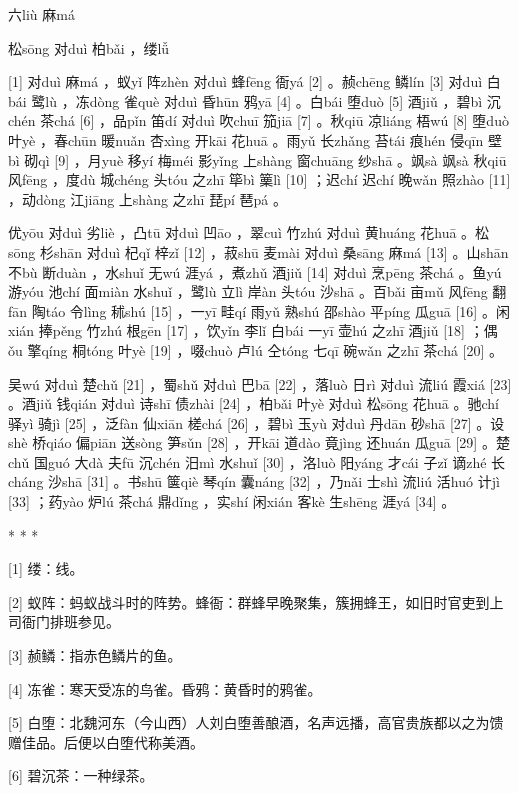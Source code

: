 \documentclass[12pt,UTF8]{ctexbook}
\begin{document}
六liù 麻má


松sōng 对duì 柏bǎi ，缕lǚ





[1] 对duì 麻má ，蚁yǐ 阵zhèn 对duì 蜂fēng 衙yá [2] 。赪chēng 鳞lín [3] 对duì 白bái 鹭lù ，冻dòng 雀què 对duì 昏hūn 鸦yā [4] 。白bái 堕duò [5] 酒jiǔ ，碧bì 沉chén 茶chá [6] ，品pǐn 笛dí 对duì 吹chuī 笳jiā [7] 。秋qiū 凉liáng 梧wú [8] 堕duò 叶yè ，春chūn 暖nuǎn 杏xìng 开kāi 花huā 。雨yǔ 长zhǎng 苔tái 痕hén 侵qīn 壁bì 砌qì [9] ，月yuè 移yí 梅méi 影yǐng 上shàng 窗chuāng 纱shā 。飒sà 飒sà 秋qiū 风fēng ，度dù 城chéng 头tóu 之zhī 筚bì 篥lì [10] ；迟chí 迟chí 晚wǎn 照zhào [11] ，动dòng 江jiāng 上shàng 之zhī 琵pí 琶pá 。

优yōu 对duì 劣liè ，凸tū 对duì 凹āo ，翠cuì 竹zhú 对duì 黄huáng 花huā 。松sōng 杉shān 对duì 杞qǐ 梓zǐ [12] ，菽shū 麦mài 对duì 桑sāng 麻má [13] 。山shān 不bù 断duàn ，水shuǐ 无wú 涯yá ，煮zhǔ 酒jiǔ [14] 对duì 烹pēng 茶chá 。鱼yú 游yóu 池chí 面miàn 水shuǐ ，鹭lù 立lì 岸àn 头tóu 沙shā 。百bǎi 亩mǔ 风fēng 翻fān 陶táo 令lìng 秫shú [15] ，一yī 畦qí 雨yǔ 熟shú 邵shào 平píng 瓜guā [16] 。闲xián 捧pěng 竹zhú 根gēn [17] ，饮yǐn 李lǐ 白bái 一yī 壶hú 之zhī 酒jiǔ [18] ；偶ǒu 擎qíng 桐tóng 叶yè [19] ，啜chuò 卢lú 仝tóng 七qī 碗wǎn 之zhī 茶chá [20] 。

吴wú 对duì 楚chǔ [21] ，蜀shǔ 对duì 巴bā [22] ，落luò 日rì 对duì 流liú 霞xiá [23] 。酒jiǔ 钱qián 对duì 诗shī 债zhài [24] ，柏bǎi 叶yè 对duì 松sōng 花huā 。驰chí 驿yì 骑jì [25] ，泛fàn 仙xiān 槎chá [26] ，碧bì 玉yù 对duì 丹dān 砂shā [27] 。设shè 桥qiáo 偏piān 送sòng 笋sǔn [28] ，开kāi 道dào 竟jìng 还huán 瓜guā [29] 。楚chǔ 国guó 大dà 夫fū 沉chén 汨mì 水shuǐ [30] ，洛luò 阳yáng 才cái 子zǐ 谪zhé 长cháng 沙shā [31] 。书shū 箧qiè 琴qín 囊náng [32] ，乃nǎi 士shì 流liú 活huó 计jì [33] ；药yào 炉lú 茶chá 鼎dǐng ，实shí 闲xián 客kè 生shēng 涯yá [34] 。



* * *



[1] 缕：线。

[2] 蚁阵：蚂蚁战斗时的阵势。蜂衙：群蜂早晚聚集，簇拥蜂王，如旧时官吏到上司衙门排班参见。

[3] 赪鳞：指赤色鳞片的鱼。

[4] 冻雀：寒天受冻的鸟雀。昏鸦：黄昏时的鸦雀。

[5] 白堕：北魏河东（今山西）人刘白堕善酿酒，名声远播，高官贵族都以之为馈赠佳品。后便以白堕代称美酒。

[6] 碧沉茶：一种绿茶。
\end{document}
